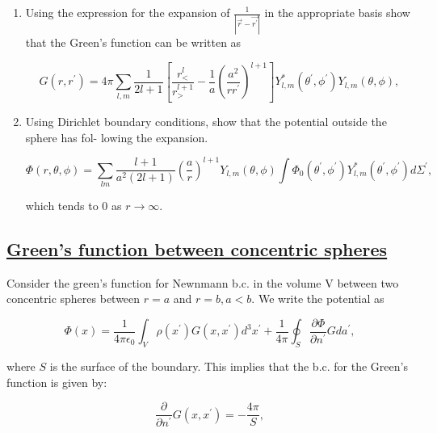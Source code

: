  \begin{enumerate}
	\item  Using the expression for the expansion of $\frac{1}{\left|\vec{r}-\vec{r^{\prime}}\right|}$ in the appropriate basis show that the Green's function can be written as
	
	\begin{equation}
		G\left(r, r^{\prime}\right)=4 \pi \sum_{l, m} \frac{1}{2 l+1}\left[\frac{r_{<}^{l}}{r_{>}^{l+1}}-\frac{1}{a}\left(\frac{a^{2}}{r r^{\prime}}\right)^{l+1}\right] Y_{l, m}^{*}\left(\theta^{\prime}, \phi^{\prime}\right) Y_{l, m}(\theta, \phi),
	\end{equation}

	\item Using Dirichlet boundary conditions, show that the potential outside the sphere has fol- lowing the expansion.
	
	\begin{equation}
		\Phi(r, \theta, \phi)=\sum_{l m}\frac{l+1}{a^{2} (2l+1)}\left(\frac{a}{r}\right)^{l+1} Y_{l, m}(\theta, \phi) \int \Phi_{0}\left(\theta^{\prime}, \phi^{\prime}\right) Y_{l, m}^{*}\left(\theta^{\prime}, \phi^{\prime}\right) d \Sigma^{\prime},
	\end{equation}

	which tends to 0 as $r \rightarrow \infty$.
\end{enumerate}

\subsection*{\hyperref[Green's function between concentric spheres]{Green's function between concentric spheres}}

Consider the green's function for Newnmann b.c. in the volume $\mathrm{V}$ between two concentric spheres between $r=a$ and $r=b, a<b$. We write the potential as

\begin{equation}
	\Phi(x)=\frac{1}{4 \pi \epsilon_{0}} \int_{V} \rho\left(x^{\prime}\right) G\left(x, x^{\prime}\right) d^{3} x^{\prime}+\frac{1}{4 \pi} \oint_{S} \frac{\partial \Phi}{\partial n^{\prime}} G d a^{\prime},
\end{equation}

where $S$ is the surface of the boundary. This implies that the b.c. for the Green's function is given by:

\begin{equation}
	\frac{\partial}{\partial n^{\prime}} G\left(x, x^{\prime}\right)=-\frac{4 \pi}{S},
\end{equation}

